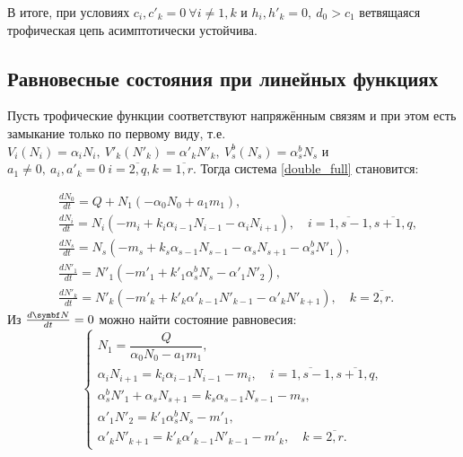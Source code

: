 В итоге, при условиях \(c_i, c'_k = 0 ~ \forall i \neq 1, k\) и \( h_i, h'_k = 0, ~ d_0 > c_1\) ветвящаяся трофическая цепь асимптотически устойчива.


\subsection{Равновесные состояния при линейных функциях}
Пусть трофические функции соответствуют напряжённым связям и при этом есть замыкание только по первому виду, т.е. \(V_i(N_i) = \alpha_i N_i, ~ V'_k(N'_k) = \alpha'_k N'_k, ~ V^b_s(N_s) = \alpha^b_s N_s\) и \( a_1 \neq 0, ~ a_i, a'_k = 0 ~ i=\overline{2,q}, k=\overline{1,r}\). Тогда система \eqref{double_full} становится:

\begin{equation} \label{double_lin}
    \begin{split}
        & \frac{d N_0}{dt} = Q + N_1 ( -\alpha_0 N_0 + a_1 m_1 ), \\
        & \frac{d N_i}{dt} = N_i (-m_i + k_i \alpha_{i-1} N_{i-1} - \alpha_i N_{i+1}), \quad i=\overline{1,s-1},  \overline{s+1,q}, \\
        & \frac{d N_s}{dt} = N_s ( -m_s + k_s \alpha_{s-1} N_{s-1} - \alpha_s N_{s+1} - \alpha_s^b N'_1 ), \\
        & \frac{d N'_1}{dt} = N'_1 ( -m'_1 + k'_1 \alpha_s^b N_s - \alpha'_1 N'_{2} ), \\
        & \frac{d N'_k}{dt} = N'_k ( -m'_k + k'_k \alpha'_{k-1} N'_{k-1} - \alpha'_k N'_{k+1} ), \quad k=\overline{2,r}.
    \end{split}
\end{equation}
Из \( \frac{d \mb{N}}{dt} = 0 \) можно найти состояние равновесия:
\begin{equation} \label{double_stab_system}
    \begin{cases}
        N_1 = \dfrac{Q}{ \alpha_0 N_0 - a_1 m_1 }, \\
        \alpha_i N_{i+1} = k_i \alpha_{i-1} N_{i-1} -m_i , \quad i=\overline{1,s-1},  \overline{s+1,q}, \\
        \alpha_s^b N'_1 + \alpha_s N_{s+1} = k_s \alpha_{s-1} N_{s-1} -m_s, \\
        \alpha'_1 N'_{2} = k'_1 \alpha_s^b N_s -m'_1, \\
        \alpha'_k N'_{k+1} = k'_k \alpha'_{k-1} N'_{k-1} -m'_k, \quad k=\overline{2,r}.
    \end{cases}
\end{equation}

